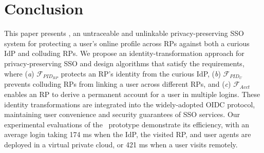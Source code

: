 \section{Conclusion}
\label{sec:conclusion}
This paper presents \usso, an untraceable and unlinkable privacy-preserving SSO system for protecting a user's online profile across RPs against both a curious IdP and colluding RPs.
We propose an identity-transformation approach for privacy-preserving SSO and design algorithms that satisfy the requirements, where (\emph{a}) $\mathcal{F}_{PID_{RP}}$ protects an RP's identity from the curious IdP, (\emph{b}) $\mathcal{F}_{PID_{U}}$ prevents colluding RPs from linking a user across different RPs, and (\emph{c}) $\mathcal{F}_{Acct}$ enables an RP to derive a permanent account for a user in multiple logins. These identity transformations are integrated into the widely-adopted OIDC protocol, maintaining user convenience and security guarantees of SSO services. Our experimental evaluations of the \usso\ prototype demonstrate its efficiency, with an average login taking 174 ms when the IdP, the visited RP, and user agents are deployed in a virtual private cloud, or 421 ms when a user visits remotely.

